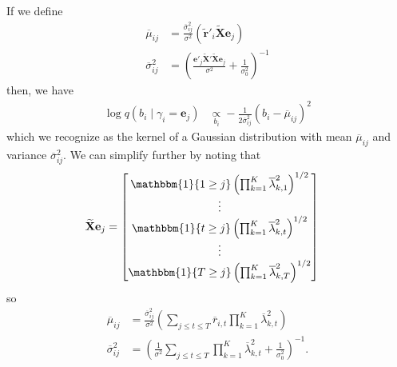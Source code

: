 \documentclass{article}
\begin{document}
\begin{itemize}
If we define
\begin{align*}
    \overline{\mu}_{ij} &= \frac{\overline{\sigma}_{ij}^2}{\sigma^2}\left(\widetilde{\mathbf{r}}'_i\widetilde{\mathbf{X}}\mathbf{e}_j\right) \\
    \overline{\sigma}_{ij}^2 &= \left(\frac{\mathbf{e}'_j\widetilde{\mathbf{X}}'\widetilde{\mathbf{X}}\mathbf{e}_j}{\sigma^2} + \frac{1}{\sigma_0^{2}}\right)^{-1}
\end{align*}
then, we have 
\begin{align*}
    \log q(b_i \;|\; \gamma_i = \mathbf{e}_j) &\underset{b_i}{\propto} -\frac{1}{2\overline{\sigma}_{ij}^2}\left(b_i - \overline{\mu}_{ij}\right)^2 
\end{align*}
which we recognize as the kernel of a Gaussian distribution with mean $\overline{\mu}_{ij}$ and variance $\overline{\sigma}_{ij}^2$. We can simplify further by noting that
\begin{align*}
    \widetilde{\mathbf{X}}\mathbf{e}_j &=  
    \begin{bmatrix}
        \mathbbm{1}\{1 \geq j\}\left(\prod_{k=1}^K\overline{\lambda}^2_{k,1}\right)^{1/2} \\ 
        \vdots \\
        \mathbbm{1}\{t \geq j\}\left(\prod_{k=1}^K\overline{\lambda}^2_{k,t}\right)^{1/2} \\ 
        \vdots \\
        \mathbbm{1}\{T \geq j\}\left(\prod_{k=1}^K\overline{\lambda}^2_{k,T}\right)^{1/2} \\ 
    \end{bmatrix}
\end{align*}
so
\begin{align*}
    \overline{\mu}_{ij} &= \frac{\overline{\sigma}_{ij}^2}{\sigma^2}\left(\sum_{j \leq t \leq T}\overline{r}_{i,t}\prod_{k=1}^K\overline{\lambda}^2_{k,t}\right) \\
    \overline{\sigma}_{ij}^2 &= \left(\frac{1}{\sigma^2}\sum_{j \leq t \leq T} \prod_{k=1}^K\overline{\lambda}^2_{k,t}  + \frac{1}{\sigma_0^{2}}\right)^{-1}.
\end{align*}


\end{itemize}
\end{document}
